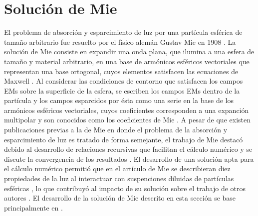 \section{Solución de Mie}

El problema de absorción y esparcimiento de luz por una partícula esférica de tamaño arbitrario fue resuelto por el físico alemán Gustav Mie en 1908 \cite{mie1908metallosung}. La solución de Mie consiste en expandir una onda plana, que ilumina a una esfera de tamaño y material arbitrario, en una base de armónicos esféricos vectoriales que representan una base ortogonal, cuyos elementos satisfacen las ecuaciones de Maxwell \cite{bohren1998absorption}. Al considerar las condiciones de contorno que satisfacen los campos EMs sobre la superficie de la esfera, se escriben los campos EMs dentro de la partícula y los campos esparcidos por ésta como una serie en la base de los armónicos esféricos vectoriales, cuyos coeficientes corresponden a una expanción multipolar y son conocidos como los coeficientes de Mie \cite{bohren1998absorption}. A pesar de que existen publicaciones previas a la de Mie en donde  el problema de la absorción y esparcimiento de luz es tratado de forma semejante, el trabajo de Mie destacó debido al desarrollo de relaciones recursivas que facilitan el cálculo numérico y se discute la convergencia de los resultados \cite{horvath2009historic}. El desarrollo de una solución apta para el cálculo numérico permitió que en el artículo de Mie se describieran diez propiedades de la luz al interactuar con suspenciones diluidas de partículas esféricas \cite{mie1908metallosung}, lo que contribuyó al impacto de su solución sobre el trabajo de otros autores \cite{horvath2009historic}. El desarrollo de la solución de Mie descrito en esta sección se base principalmente en \cite{bohren1998absorption}.

